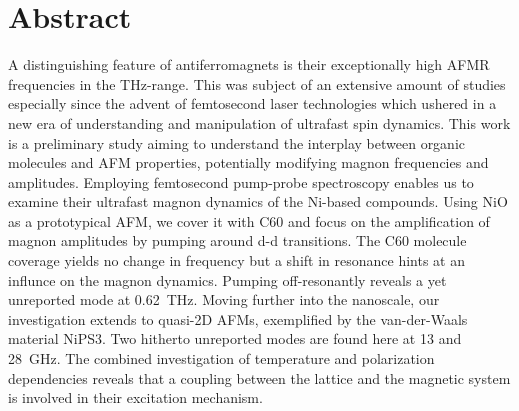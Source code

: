 \thispagestyle{plain}

\section*{Abstract}
A distinguishing feature of antiferromagnets is their exceptionally high AFMR frequencies in the THz-range.
This was subject of an extensive amount of studies especially since the advent of femtosecond laser technologies which ushered in a new era of understanding and manipulation of ultrafast spin dynamics.
This work is a preliminary study aiming to understand the interplay between organic molecules and AFM properties, potentially modifying magnon frequencies and amplitudes.
Employing femtosecond pump-probe spectroscopy enables us to examine their ultrafast magnon dynamics of the Ni-based compounds.
Using NiO as a prototypical AFM, we cover it with C60 and focus on the amplification of magnon amplitudes by pumping around d-d transitions.
The C60 molecule coverage yields no change in frequency but a shift in resonance hints at an influnce on the magnon dynamics. 
Pumping off-resonantly reveals a yet unreported mode at \qty{0.62}{THz}. 
Moving further into the nanoscale, our investigation extends to quasi-2D AFMs, exemplified by the van-der-Waals material NiPS3.
Two hitherto unreported modes are found here at 13 and \qty{28}{GHz}.
The combined investigation of temperature and polarization dependencies reveals that a coupling between the lattice and the magnetic system is involved in their excitation mechanism.













